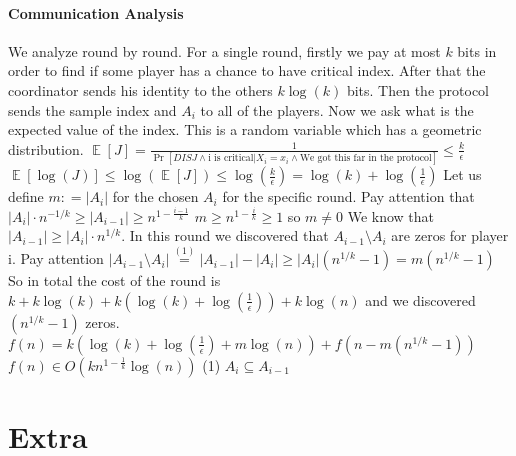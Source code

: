 \documentclass{article}
\theoremstyle{plain}
\begin{document}
\paragraph{Communication Analysis}
We analyze round by round. For a single round, firstly we pay at most $k$ bits in order to find if some player has a chance to have critical index. After that the coordinator sends his identity to the others $k\log(k)$ bits. Then the protocol sends the sample index and $A_{i}$ to all of the players. Now we ask what is the expected value of the index. \newline
This is a random variable which has a geometric distribution. \newline
$ \mathop{\mathbb{E}} [J] = \frac{1}{\Pr[DISJ \land \text{i is critical} | X_i = x_i \land \text{We got this far in the protocol}]} \leq \frac{k}{\epsilon}$ \newline
$\mathop{\mathbb{E}} [\log(J)] \leq \log(\mathop{\mathbb{E}} [J]) \leq \log(\frac{k}{\epsilon}) = \log(k) + \log(\frac{1}{\epsilon})$ \newline
Let us define $m : = |A_i|$ for the chosen $A_i$ for the specific round.
Pay attention that $|A_i| \cdot n^{-1/k} \geq |A_{i-1}| \geq n^{1-\frac{i-1}{k}}$ \newline
$m \geq n^{1-\frac{i}{k}} \geq 1$ so $m \neq 0$\newline
We know that $|A_{i-1}| \geq |A_i| \cdot n^{1/k}$. In this round we discovered that $A_{i-1} \setminus A_i$ are zeros for player i. Pay attention $|A_{i-1} \setminus A_i| \overset{(1)}{=} |A_{i-1}| - |A_i| \geq |A_i|(n^{1/k} - 1) = m(n^{1/k} - 1)$ \newline
So in total the cost of the round is $k + k\log(k) + k(\log(k) + \log(\frac{1}{\epsilon})) + k\log(n)$ and we discovered $(n^{1/k} - 1)$ zeros. \newline
$f(n) = k(\log(k) + \log(\frac{1}{\epsilon}) + m\log(n)) + f(n - m(n^{1/k} - 1))$ \newline 
$f(n) \in O(kn^{1-\frac{1}{k}}\log(n))$ \newline
(1) $A_i \subseteq A_{i-1}$
\section{Extra}
\end{document}
